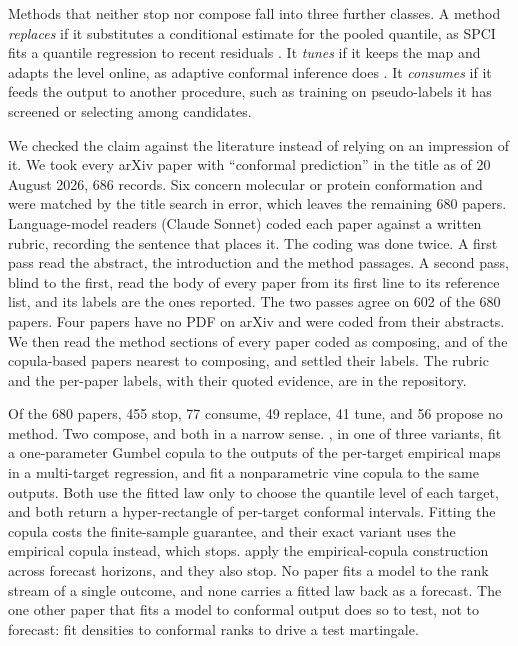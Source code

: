 \documentclass[11pt]{article}
\theoremstyle{remark}
\begin{document}
Methods that neither stop nor compose fall into three further classes. A method
\emph{replaces} if it substitutes a conditional estimate for the pooled quantile, as
SPCI fits a quantile regression to recent residuals \citep{xu2023spci}. It
\emph{tunes} if it keeps the map and adapts the level online, as adaptive conformal
inference does \citep{gibbs2021adaptive}. It \emph{consumes} if it feeds the output
to another procedure, such as training on pseudo-labels it has screened or selecting
among candidates.

We checked the claim against the literature instead of relying on an impression of
it. We took every arXiv paper with ``conformal prediction'' in the title as of
20 August 2026, 686 records. Six concern molecular or protein conformation and were
matched by the title search in error, which leaves the remaining 680 papers. Language-model
readers (Claude Sonnet) coded each paper against a written rubric, recording the
sentence that places it. The coding was done twice. A first pass read the abstract,
the introduction and the method passages. A second pass, blind to the first, read the
body of every paper from its first line to its reference list, and its labels are
the ones reported. The two passes agree on 602 of the 680 papers. Four papers have no
PDF on arXiv and were coded from their abstracts. We then read the method sections of
every paper coded as composing, and of the copula-based papers nearest to composing,
and settled their labels. The
rubric and the per-paper labels, with their quoted evidence, are in the repository.

Of the 680 papers, 455 stop, 77 consume, 49 replace, 41 tune, and 56 propose no
method. Two compose, and both in a narrow sense. \citet{messoudi2021copula}, in one of
three variants, fit a one-parameter Gumbel copula to the outputs of the per-target empirical maps in a
multi-target regression, and \citet{park2024semiparametric} fit a nonparametric vine
copula to the same outputs. Both use the fitted law only to choose the quantile level
of each target, and both return a hyper-rectangle of per-target conformal intervals.
Fitting the copula costs \citet{park2024semiparametric} the finite-sample guarantee,
and their exact variant uses the empirical copula instead, which stops.
\citet{sun2024copula} apply the empirical-copula construction across forecast
horizons, and they also stop. No paper fits a model to the rank stream of a single
outcome, and none carries a fitted law back as a forecast. The one other paper that
fits a model to conformal output does so to test, not to forecast:
\citet{lardy2024anytime} fit densities to conformal ranks to drive a test martingale.
\end{document}
